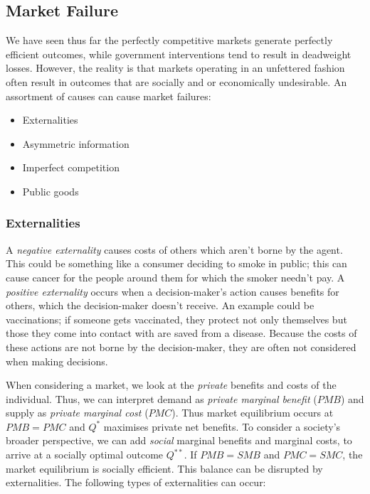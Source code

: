 \documentclass[12pt]{report}
\begin{document}
\begin{flushleft}
\subsection*{Market Failure}
We have seen thus far the perfectly competitive markets generate perfectly
efficient outcomes, while government interventions tend to result in 
deadweight losses. However, the reality is that markets operating in an
unfettered fashion often result in outcomes that are socially and or 
economically undesirable. An assortment of causes can cause market failures:

\begin{itemize}
    \item Externalities
    \item Asymmetric information
    \item Imperfect competition
    \item Public goods
\end{itemize}

\subsubsection*{Externalities}

A \textit{negative externality} causes costs of others which aren't borne
by the agent. This could be something like a consumer deciding
to smoke in public; this can cause cancer for the people around them for
which the smoker needn't pay. A \textit{positive externality} occurs when
a decision-maker's action causes benefits for others, which the decision-maker
doesn't receive. An example could be vaccinations; if someone gets vaccinated,
they protect not only themselves but those they come into contact with are
saved from a disease. Because the costs of these actions are not borne
by the decision-maker, they are often not considered when making decisions.

\bigskip
When considering a market, we look at the \textit{private} benefits and 
costs of the individual. Thus, we can interpret demand as \textit{private
marginal benefit} (\(PMB\)) and supply as \textit{private marginal cost}
(\(PMC\)). Thus market equilibrium occurs at \(PMB = PMC\) and \(Q^*\)
maximises private net benefits. To consider a society's broader perspective,
we can add \textit{social} marginal benefits and marginal costs, to arrive
at a socially optimal outcome \(Q^{**}\). If \(PMB = SMB\) and \(PMC = SMC\),
the market equilibrium is socially efficient. This balance can be disrupted
by externalities. The following types of externalities can occur:


\end{flushleft}
\end{document}
